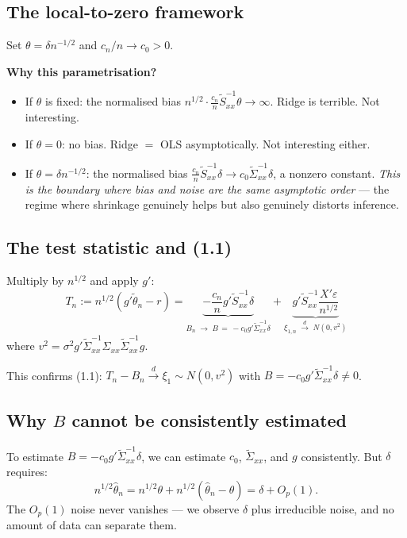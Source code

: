\documentclass[11pt]{article}
\theoremstyle{definition}
\begin{document}
\subsection{The local-to-zero framework}
 
Set $\theta = \delta n^{-1/2}$ and $c_n/n \to c_0 > 0$.
 
\medskip
 
\textbf{Why this parametrisation?}
\begin{itemize}
  \item If $\theta$ is fixed: the normalised bias
    $n^{1/2} \cdot \frac{c_n}{n}\tilde S_{xx}^{-1}\theta \to \infty$.
    Ridge is terrible. Not interesting.
  \item If $\theta = 0$: no bias. Ridge $=$ OLS asymptotically.
    Not interesting either.
  \item If $\theta = \delta n^{-1/2}$: the normalised bias
    $\frac{c_n}{n}\tilde S_{xx}^{-1}\delta \to c_0\tilde\Sigma_{xx}^{-1}\delta$,
    a nonzero constant. \textit{This is the boundary where bias and noise
    are the same asymptotic order} --- the regime where shrinkage
    genuinely helps but also genuinely distorts inference.
\end{itemize}
 
\subsection{The test statistic and (1.1)}
 
Multiply by $n^{1/2}$ and apply $g'$:
\[
  T_n := n^{1/2}(g'\tilde\theta_n - r)
  = \underbrace{-\frac{c_n}{n}g'\tilde S_{xx}^{-1}\delta}_{B_n \;\to\; B \,=\, -c_0 g'\tilde\Sigma_{xx}^{-1}\delta}
  + \underbrace{g'\tilde S_{xx}^{-1}\frac{X'\varepsilon}{n^{1/2}}}_{\xi_{1,n} \;\xrightarrow{d}\; N(0, v^2)}
\]
where $v^2 = \sigma^2 g'\tilde\Sigma_{xx}^{-1}\Sigma_{xx}\tilde\Sigma_{xx}^{-1}g$.
 
\medskip
 
This confirms (1.1): $T_n - B_n \xrightarrow{d} \xi_1 \sim N(0,v^2)$
with $B = -c_0 g'\tilde\Sigma_{xx}^{-1}\delta \ne 0$.
 
\subsection{Why $B$ cannot be consistently estimated}
 
To estimate $B = -c_0 g'\tilde\Sigma_{xx}^{-1}\delta$, we can estimate
$c_0$, $\tilde\Sigma_{xx}$, and $g$ consistently. But $\delta$ requires:
\[
  n^{1/2}\hat\theta_n = n^{1/2}\theta + n^{1/2}(\hat\theta_n - \theta)
  = \delta + O_p(1).
\]
The $O_p(1)$ noise never vanishes --- we observe $\delta$ plus
irreducible noise, and no amount of data can separate them.
 
\end{document}
